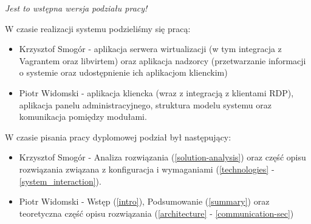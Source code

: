 \documentclass[../wstep.tex]{subfiles}
\begin{document}
\textit{Jest to wstępna wersja podziału pracy!}

W czasie realizacji systemu podzieliśmy się pracą:
\begin{itemize}
    \item Krzysztof Smogór - aplikacja serwera wirtualizacji (w tym integracja z Vagrantem oraz libvirtem) oraz aplikacja nadzorcy (przetwarzanie informacji o systemie oraz udostępnienie ich aplikacjom klienckim)
    \item Piotr Widomski - aplikacja kliencka (wraz z integracją z klientami RDP), aplikacja panelu administracyjnego, struktura modelu systemu oraz komunikacja pomiędzy modułami.
\end{itemize}

W czasie pisania pracy dyplomowej podział był następujący:
\begin{itemize}
    \item Krzysztof Smogór - Analiza rozwiązania (\ref{solution-analysis}) oraz część opisu rozwiązania związana z konfiguracja i wymaganiami (\ref{technologies} - \ref{system_interaction}).
    \item Piotr Widomski - Wstęp (\ref{intro}), Podsumowanie (\ref{summary}) oraz teoretyczna część opisu rozwiązania (\ref{architecture} - \ref{communication-sec})
\end{itemize}
\end{document}
